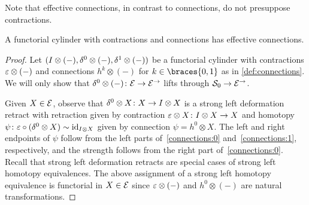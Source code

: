 \documentclass[reqno,10pt,a4paper,oneside]{amsart}
\begin{document}
Note that effective connections, in contrast to connections, do not presuppose contractions.

\begin{proposition} \label{connections-are-effective}
A functorial cylinder with contractions and connections has effective connections.
\end{proposition}

\begin{proof}
Let $(I \otimes (-), \delta^0 \otimes (-), \delta^1 \otimes (-))$ be a functorial cylinder with contractions $\varepsilon \otimes (-)$ and connections $h^k \otimes (-)$ for $k \in \braces{0, 1}$ as in \cref{def:connections}.
We will only show that $\delta^0 \otimes (-) \colon \mathcal{E} \to \mathcal{E}^\to$ lifts through $\mathcal{S}_0 \to \mathcal{E}^\to$.

Given $X \in \mathcal{E}$, observe that $\delta^0 \otimes X \colon X \to I \otimes X$ is a strong left deformation retract with retraction given by contraction $\varepsilon \otimes X \colon I \otimes X \to X$ and homotopy $\psi \colon \varepsilon \mathbin{\circ} (\delta^0 \otimes X) \sim \operatorname{id}_{I \otimes X}$ given by connection $\psi = h^0 \otimes X$.
The left and right endpoints of $\psi$ follow from the left parts of~\eqref{connections:0} and~\eqref{connections:1}, respectively, and the strength follows from the right part of~\eqref{connections:0}.
Recall that strong left deformation retracts are special cases of strong left homotopy equivalences.
The above assignment of a strong left homotopy equivalence is functorial in $X \in \mathcal{E}$ since $\varepsilon \otimes (-)$ and $h^0 \otimes (-)$ are natural transformations.
\end{proof}
\end{document}
